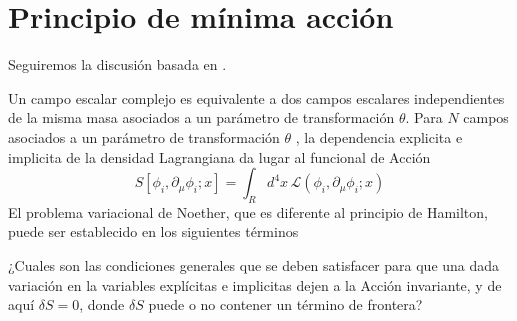 \section{Principio de mínima acción}



Seguiremos la discusión basada en \cite{Brading:2000hc,Brading:2003nv,Sundermeyer:2014kha}.

Un campo escalar complejo es equivalente a dos campos escalares independientes de la misma masa asociados a un parámetro de transformación $\theta$. Para $N$ campos asociados a un parámetro de transformación $\theta$ , la dependencia explicita e implicita de la densidad Lagrangiana da lugar al funcional de Acción
\begin{equation}
  S[\phi_i,\partial_\mu\phi_i;x]=\int_{R}d^4x\,\mathcal{L}(\phi_i,\partial_\mu\phi_i;x)
\end{equation}
El problema variacional de Noether, que es diferente al principio de Hamilton, puede ser establecido en los siguientes términos

¿Cuales son las condiciones generales que se deben satisfacer para que una dada variación en la variables explícitas e implicitas dejen a la Acción invariante, y de aquí $\delta S=0$, donde $\delta S$ puede o no contener un término de frontera?

